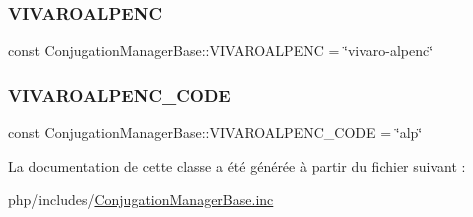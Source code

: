 \subsubsection{\texorpdfstring{V\+I\+V\+A\+R\+O\+A\+L\+P\+E\+NC}{VIVAROALPENC}}
{\footnotesize\ttfamily const Conjugation\+Manager\+Base\+::\+V\+I\+V\+A\+R\+O\+A\+L\+P\+E\+NC = \char`\"{}vivaro-\/alpenc\char`\"{}}

\hypertarget{class_conjugation_manager_base_a73f34b8b178aa35bcc8d35515e44d306}{}\label{class_conjugation_manager_base_a73f34b8b178aa35bcc8d35515e44d306} 
\subsubsection{\texorpdfstring{V\+I\+V\+A\+R\+O\+A\+L\+P\+E\+N\+C\+\_\+\+C\+O\+DE}{VIVAROALPENC\_CODE}}
{\footnotesize\ttfamily const Conjugation\+Manager\+Base\+::\+V\+I\+V\+A\+R\+O\+A\+L\+P\+E\+N\+C\+\_\+\+C\+O\+DE = \char`\"{}alp\char`\"{}}



La documentation de cette classe a été générée à partir du fichier suivant \+:\begin{DoxyCompactItemize}
\item 
php/includes/\hyperlink{_conjugation_manager_base_8inc}{Conjugation\+Manager\+Base.\+inc}\end{DoxyCompactItemize}
